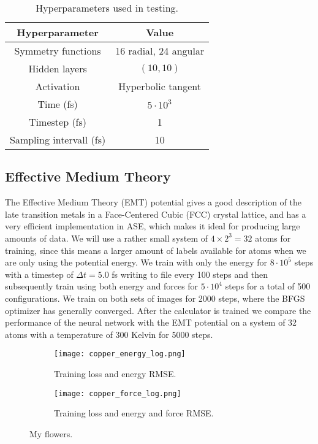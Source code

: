 \begin{table}[H]
\centering
\begin{tabular}{|c c|}
\hline
Hyperparameter & Value \\
\hline \hline
Symmetry functions & 16 radial, 24 angular \\
    Hidden layers & $(10, 10)$ \\
Activation & Hyperbolic tangent \\
    Time (fs) & $5 \cdot 10^3$ \\
    Timestep (fs) & 1 \\
    Sampling intervall (fs) & 10 \\
\hline
\end{tabular}
\caption{Hyperparameters used in testing.}
\label{tab:hyperparam-test}
\end{table}

\subsection{Effective Medium Theory}
The Effective Medium Theory (EMT) potential gives a good description
of the late transition metals in a Face-Centered Cubic (FCC) crystal
lattice, and has a very efficient implementation in ASE,
which makes it ideal for producing large amounts of data.
We will use a rather small system of $4 \times 2^3 = 32$ atoms
for training, since this means a larger amount of labels available
for atoms when we are only using the potential energy.
We train with only the energy for $8 \cdot 10^5$ steps
with a timestep of $\Delta t = 5.0$ fs
writing to file every 100 steps and then subsequently
train using both energy and forces for $5 \cdot 10^4$ steps
for a total of 500 configurations. We train on both sets of images
for 2000 steps, where the BFGS optimizer has generally converged.
After the calculator is trained we compare the performance
of the neural network with the EMT potential on a system
of 32 atoms with a temperature of 300 Kelvin for 5000 steps.

\begin{figure}[H]
\begin{adjustbox}{max width=1.2\linewidth,center}
\centering
  \begin{subfigure}[b]{0.55\textwidth}
      \texttt{[image: copper\_energy\_log.png]}
      \caption{Training loss and energy RMSE.}
    \label{fig:f1}
  \end{subfigure}
  \hfill
  \begin{subfigure}[b]{0.55\textwidth}
      \texttt{[image: copper\_force\_log.png]}
      \caption{Training loss and energy and force RMSE.}
    \label{fig:f2}
  \end{subfigure}
\end{adjustbox}
\caption{My flowers.}
    \label{fig:copper_log}
\end{figure}


